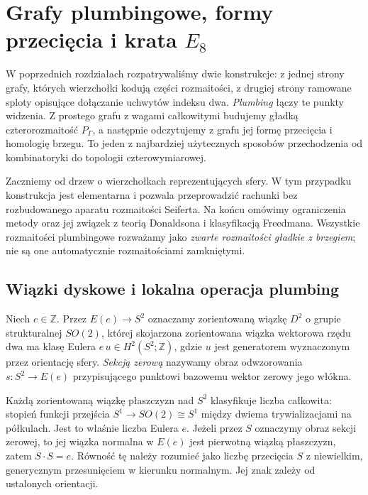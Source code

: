 \chapter{Grafy plumbingowe, formy przecięcia i krata \texorpdfstring{$E_8$}{E8}}
\label{ch:tg-plumbing}

W poprzednich rozdziałach rozpatrywaliśmy dwie konstrukcje: z jednej
strony grafy, których wierzchołki kodują części rozmaitości, z drugiej
strony ramowane sploty opisujące dołączanie uchwytów indeksu dwa.
\emph{Plumbing} łączy te punkty widzenia. Z prostego grafu z wagami
całkowitymi budujemy gładką czterorozmaitość $P_\Gamma$, a następnie
odczytujemy z grafu jej formę przecięcia i homologię brzegu.
To jeden z najbardziej użytecznych sposobów przechodzenia od
kombinatoryki do topologii czterowymiarowej.

Zaczniemy od drzew o wierzchołkach reprezentujących sfery. W tym
przypadku konstrukcja jest elementarna i pozwala przeprowadzić
rachunki bez rozbudowanego aparatu rozmaitości Seiferta. Na końcu
omówimy ograniczenia metody oraz jej związek z teorią Donaldsona
i klasyfikacją Freedmana. Wszystkie rozmaitości plumbingowe
rozważamy jako \emph{zwarte rozmaitości gładkie z brzegiem};
nie są one automatycznie rozmaitościami zamkniętymi.

\section{Wiązki dyskowe i lokalna operacja plumbing}
\label{sec:tg-plumbing-definition}

\begin{definicja}
Niech $e\in\mathbb Z$. Przez $E(e)\to S^2$ oznaczamy zorientowaną
wiązkę $D^2$ o grupie strukturalnej $SO(2)$, której skojarzona
zorientowana wiązka wektorowa rzędu dwa ma klasę Eulera
$e\,u\in H^2(S^2;\mathbb Z)$, gdzie $u$ jest generatorem
wyznaczonym przez orientację sfery. \emph{Sekcją zerową}
nazywamy obraz odwzorowania $s\colon S^2\to E(e)$ przypisującego
punktowi bazowemu wektor zerowy jego włókna.
\end{definicja}

Każdą zorientowaną wiązkę płaszczyzn nad $S^2$ klasyfikuje
liczba całkowita: stopień funkcji przejścia
$S^1\to SO(2)\cong S^1$ między dwiema trywializacjami
na półkulach. Jest to właśnie liczba Eulera $e$.
Jeżeli przez $S$ oznaczymy obraz sekcji zerowej,
to jej wiązka normalna w $E(e)$ jest pierwotną wiązką
płaszczyzn, zatem $S\cdot S=e$. Równość tę należy
rozumieć jako liczbę przecięcia $S$ z niewielkim,
generycznym przesunięciem w kierunku normalnym.
Jej znak zależy od ustalonych orientacji.

